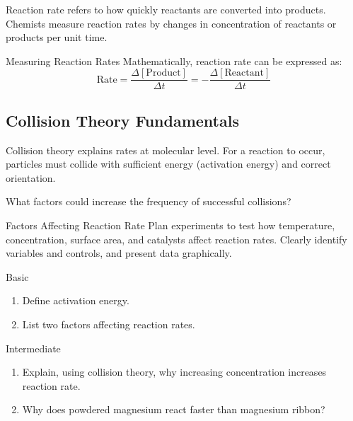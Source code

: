 Reaction rate refers to how quickly reactants are converted into products. Chemists measure reaction rates by changes in concentration of reactants or products per unit time. 

\begin{keyconcept}{Measuring Reaction Rates}
Mathematically, reaction rate can be expressed as:
\[
\text{Rate} = \frac{\Delta [\text{Product}]}{\Delta t} = -\frac{\Delta [\text{Reactant}]}{\Delta t}
\]
\end{keyconcept}

\subsection{Collision Theory Fundamentals}
\FloatBarrier
\FloatBarrier
\FloatBarrier

Collision theory explains rates at molecular level. For a reaction to occur, particles must collide with sufficient energy (activation energy) and correct orientation.

\begin{stopandthink}
What factors could increase the frequency of successful collisions?
\end{stopandthink}

\begin{investigation}{Factors Affecting Reaction Rate}
Plan experiments to test how temperature, concentration, surface area, and catalysts affect reaction rates. Clearly identify variables and controls, and present data graphically.
\end{investigation}


\FloatBarrier

\begin{tieredquestions}{Basic}
\begin{enumerate}
    \item Define activation energy.
    \item List two factors affecting reaction rates.
\end{enumerate}
\end{tieredquestions}

\begin{tieredquestions}{Intermediate}
\begin{enumerate}
    \item Explain, using collision theory, why increasing concentration increases reaction rate.
    \item Why does powdered magnesium react faster than magnesium ribbon?
\end{enumerate}
\end{tieredquestions}

